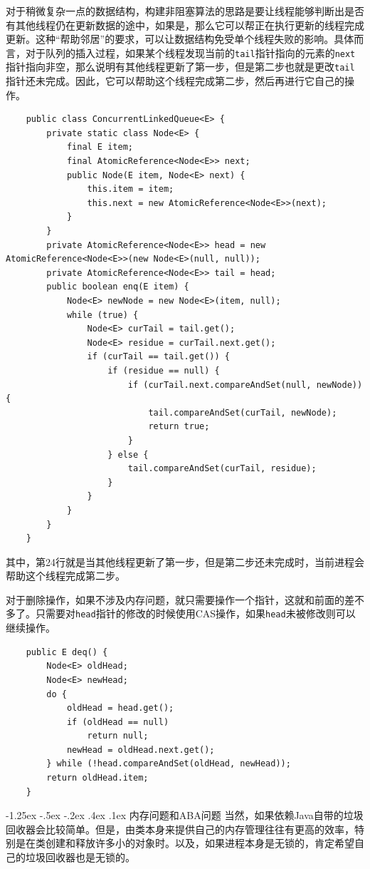 \documentclass[a4paper, 11pt]{ctexart}
\makeatletter
\newcommand{\xiaosihao}{\fontsize{12pt}{\baselineskip}\selectfont}
\renewcommand\subsection{\@startsection{subsection}{1}{\z@}%
{-1.25ex \@plus -.5ex \@minus -.2ex}%
{.4ex \@plus .1ex}%
{\normalfont\xiaosihao\CJKfamily{hei}}}
\makeatother
\begin{document}
对于稍微复杂一点的数据结构，构建非阻塞算法的思路是要让线程能够判断出是否有其他线程仍在更新数据的途中，如果是，那么它可以帮正在执行更新的线程完成更新。这种“帮助邻居”的要求，可以让数据结构免受单个线程失败的影响。具体而言，对于队列的插入过程，如果某个线程发现当前的\lstinline|tail|指针指向的元素的\lstinline|next|指针指向非空，那么说明有其他线程更新了第一步，但是第二步也就是更改\lstinline|tail|指针还未完成。因此，它可以帮助这个线程完成第二步，然后再进行它自己的操作。
\begin{lstlisting}
    public class ConcurrentLinkedQueue<E> {
        private static class Node<E> {
            final E item;
            final AtomicReference<Node<E>> next;
            public Node(E item, Node<E> next) {
                this.item = item;
                this.next = new AtomicReference<Node<E>>(next);
            }
        }
        private AtomicReference<Node<E>> head = new AtomicReference<Node<E>>(new Node<E>(null, null));
        private AtomicReference<Node<E>> tail = head;
        public boolean enq(E item) {
            Node<E> newNode = new Node<E>(item, null);
            while (true) {
                Node<E> curTail = tail.get();
                Node<E> residue = curTail.next.get();
                if (curTail == tail.get()) {
                    if (residue == null) {
                        if (curTail.next.compareAndSet(null, newNode)) {
                            tail.compareAndSet(curTail, newNode);
                            return true;
                        }
                    } else {
                        tail.compareAndSet(curTail, residue);
                    }
                }
            }
        }
    }
\end{lstlisting}

其中，第24行就是当其他线程更新了第一步，但是第二步还未完成时，当前进程会帮助这个线程完成第二步。

对于删除操作，如果不涉及内存问题，就只需要操作一个指针，这就和前面的差不多了。只需要对\lstinline|head|指针的修改的时候使用CAS操作，如果\lstinline|head|未被修改则可以继续操作。
\begin{lstlisting}
    public E deq() {
        Node<E> oldHead;
        Node<E> newHead;
        do {
            oldHead = head.get();
            if (oldHead == null)
                return null;
            newHead = oldHead.next.get();
        } while (!head.compareAndSet(oldHead, newHead));
        return oldHead.item;
    }
\end{lstlisting}
\subsection{内存问题和ABA问题}
当然，如果依赖Java自带的垃圾回收器会比较简单。但是，由类本身来提供自己的内存管理往往有更高的效率，特别是在类创建和释放许多小的对象时。以及，如果进程本身是无锁的，肯定希望自己的垃圾回收器也是无锁的。
\end{document}
